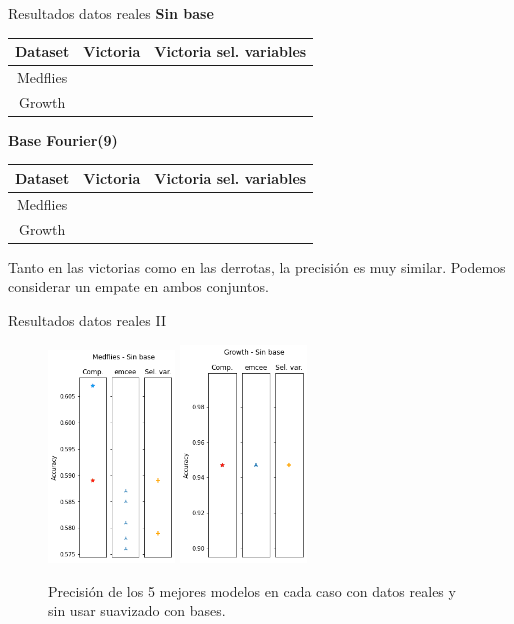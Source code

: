 \documentclass[10pt, spanish, professionalfonts]{beamer}
\newcommand{\cmark}{\ding{51}}%
\newcommand{\xmark}{\ding{55}}%
\begin{document}
\begin{frame}{Resultados datos reales}
\textbf{Sin base}
  \begin{table}
    \begin{tabular}{c|cc}
      Dataset & Victoria & Victoria sel. variables \\ \hline
      Medflies & \xmark & \xmark\\
      Growth & \cmark & \cmark\\
    \end{tabular}
  \end{table}

  \textbf{Base Fourier(9)}
  \begin{table}
    \begin{tabular}{c|cc}
      Dataset & Victoria & Victoria sel. variables \\ \hline
      Medflies & \xmark &  \xmark\\
      Growth & \cmark & \cmark\\
    \end{tabular}
  \end{table}

  Tanto en las victorias como en las derrotas, la precisión es muy similar. Podemos considerar un empate en ambos conjuntos.
\end{frame}

\begin{frame}{Resultados datos reales II}
  \begin{figure}
    \includegraphics[width=0.3\textwidth]{img/results/log_medflies_nobase}\hspace{5em}
    \includegraphics[width=0.3\textwidth]{img/results/log_growth_nobase}
    \caption{Precisión de los 5 mejores modelos en cada caso con datos reales y sin usar suavizado con bases.}
  \end{figure}
\end{frame}
\end{document}
